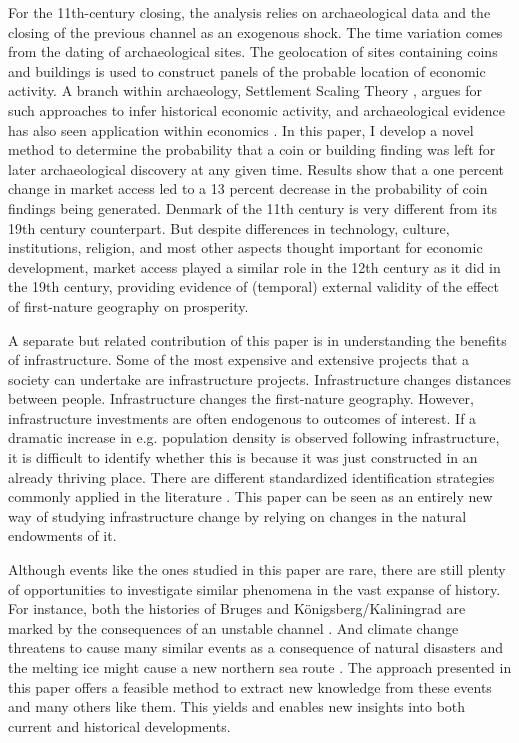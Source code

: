 \documentclass[11pt]{article}
\begin{document}
For the 11th-century closing, the analysis relies on archaeological data and the closing of the previous channel as an exogenous shock. The time variation comes from the dating of archaeological sites. The geolocation of sites containing coins and buildings is used to construct panels of the probable location of economic activity. A branch within archaeology, Settlement Scaling Theory \citep{Ortman2020}, argues for such approaches to infer historical economic activity, and archaeological evidence has also seen application within economics \citep{Davis2002, Barjamovic2019, Bakker2021Phonecians, Allen2023}. In this paper, I develop a novel method to determine the probability that a coin or building finding was left for later archaeological discovery at any given time. Results show that a one percent change in market access led to a 13 percent decrease in the probability of coin findings being generated. Denmark of the 11th century is very different from its 19th century counterpart. But despite differences in technology, culture, institutions, religion, and most other aspects thought important for economic development, market access played a similar role in the 12th century as it did in the 19th century, providing evidence of (temporal) external validity of the effect of first-nature geography on prosperity.

A separate but related contribution of this paper is in understanding the benefits of infrastructure. Some of the most expensive and extensive projects that a society can undertake are infrastructure projects. Infrastructure changes distances between people. Infrastructure changes the first-nature geography. However, infrastructure investments are often endogenous to outcomes of interest.  If a dramatic increase in e.g. population density is observed following infrastructure, it is difficult to identify whether this is because it was just constructed in an already thriving place. There are different standardized identification strategies commonly applied in the literature \citep{Redding2015}. This paper can be seen as an entirely new way of studying infrastructure change by relying on changes in the natural endowments of it.

Although events like the ones studied in this paper are rare, there are still plenty of opportunities to investigate similar phenomena in the vast expanse of history. For instance, both the histories of Bruges and Königsberg/Kaliningrad are marked by the consequences of an unstable channel \citep{Houtte1966, Charlier2011, Britannica2018}. And climate change threatens to cause many similar events as a consequence of natural disasters \citep{IPCC2022} and the melting ice might cause a new northern sea route \citep{Bekker2018NothernSeaRoute}. The approach presented in this paper offers a feasible method to extract new knowledge from these events and many others like them. This yields and enables new insights into both current and historical developments. 
\end{document}
